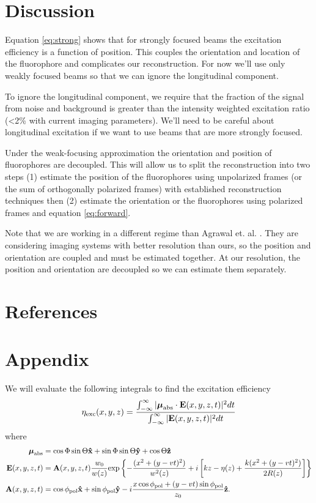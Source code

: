 \documentclass[11pt]{article}
\begin{document}
\section{Discussion}
Equation \ref{eq:strong} shows that for strongly focused beams the excitation
efficiency is a function of position. This couples the orientation and location
of the fluorophore and complicates our reconstruction. For now we'll use only
weakly focused beams so that we can ignore the longitudinal component.

To ignore the longitudinal component, we require that the fraction of the signal
from noise and background is greater than the intensity weighted excitation
ratio (\textless 2\% with current imaging parameters). We'll need to be careful about
longitudinal excitation if we want to use beams that are more strongly focused.

Under the weak-focusing approximation the orientation and position of
fluorophores are decoupled. This will allow us to split the reconstruction into
two steps (1) estimate the position of the fluorophores using unpolarized frames
(or the sum of orthogonally polarized frames) with established reconstruction
techniques then (2) estimate the orientation or the fluorophores using polarized
frames and equation \ref{eq:forward}.

Note that we are working in a different regime than Agrawal et. al. \cite{agrawal}. They
are considering imaging systems with better resolution than ours, so the
position and orientation are coupled and must be estimated together. At our
resolution, the position and orientation are decoupled so we can estimate them
separately.

\section{References}
\setlength{}
\printbibliography[heading=none]
\pagebreak

\section{Appendix}
We will evaluate the following integrals to find the excitation efficiency
\begin{align}
  \eta_{\text{exc}}(x,y,z) = \frac{\int_{-\infty}^{\infty}|\boldsymbol{\mu}_{\text{abs}} \cdot \mathbf{E}(x,y,z,t)|^2dt}{\int_{-\infty}^{\infty}|\mathbf{E}(x,y,z,t)|^2dt}\label{eq:excitation}
\end{align}
where
\begin{align}
  \boldsymbol{\mu}_{\text{abs}} &= \cos\Phi\sin\Theta\mathbf{\hat{x}} + \sin\Phi\sin\Theta\mathbf{\hat{y}} + \cos\Theta\mathbf{\hat{z}}\\
  \mathbf{E}(x,y,z,t) &= \mathbf{A}(x,y,z,t)\frac{w_0}{w(z)}\text{exp}\left\{{-\frac{(x^2+(y-vt)^2)}{w^2(z)}}+i\left[kz - \eta(z) + \frac{k(x^2+(y-vt)^2)}{2R(z)}\right]\right\}\\
  \mathbf{A}(x,y,z,t) &= \cos\phi_{\text{pol}}\mathbf{\hat{x}} + \sin\phi_{\text{pol}}\mathbf{\hat{y}} - i\frac{x\cos\phi_{\text{pol}} + (y - vt)\sin\phi_{\text{pol}}}{z_0}\mathbf{\hat{z}}.\label{eq:scanned_jones}
\end{align}
\end{document}
